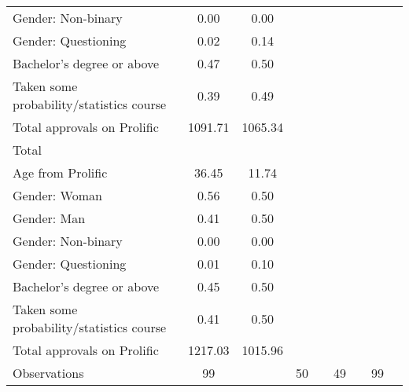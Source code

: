 {\begin{tabular}{l*{4}{cc}}
Gender: Non-binary  &        0.00&        0.00&            &            &            &            &            &            \\
Gender: Questioning &        0.02&        0.14&            &            &            &            &            &            \\
Bachelor's degree or above&        0.47&        0.50&            &            &            &            &            &            \\
Taken some probability/statistics course&        0.39&        0.49&            &            &            &            &            &            \\
Total approvals on Prolific&     1091.71&     1065.34&            &            &            &            &            &            \\
\hline
Total               &            &            &            &            &            &            &            &            \\
Age from Prolific   &       36.45&       11.74&            &            &            &            &            &            \\
Gender: Woman       &        0.56&        0.50&            &            &            &            &            &            \\
Gender: Man         &        0.41&        0.50&            &            &            &            &            &            \\
Gender: Non-binary  &        0.00&        0.00&            &            &            &            &            &            \\
Gender: Questioning &        0.01&        0.10&            &            &            &            &            &            \\
Bachelor's degree or above&        0.45&        0.50&            &            &            &            &            &            \\
Taken some probability/statistics course&        0.41&        0.50&            &            &            &            &            &            \\
Total approvals on Prolific&     1217.03&     1015.96&            &            &            &            &            &            \\
\hline
Observations        &          99&            &          50&            &          49&            &          99&            \\
\hline\hline
\end{tabular}
}
